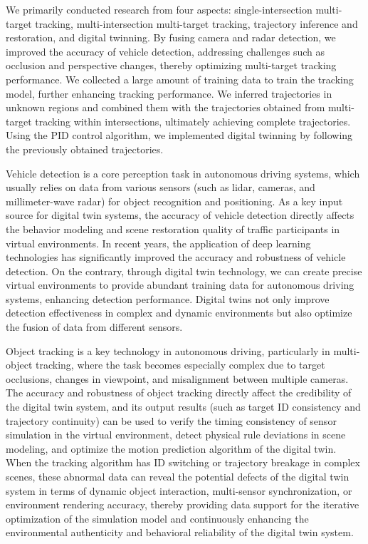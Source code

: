 \documentclass[lettersize,journal]{IEEEtran}
\begin{document}
We primarily conducted research from four aspects: single-intersection multi-target tracking, multi-intersection multi-target tracking, trajectory inference and restoration, and digital twinning. 
By fusing camera and radar detection, we improved the accuracy of vehicle detection, addressing challenges such as occlusion and perspective changes, thereby optimizing multi-target tracking performance. 
We collected a large amount of training data to train the tracking model, further enhancing tracking performance. 
We inferred trajectories in unknown regions and combined them with the trajectories obtained from multi-target tracking within intersections, ultimately achieving complete trajectories. 
Using the PID control algorithm, we implemented digital twinning by following the previously obtained trajectories.

Vehicle detection is a core perception task in autonomous driving systems, which usually relies on data from various sensors (such as lidar, cameras, and millimeter-wave radar) for object recognition and positioning. As a key input source for digital twin systems, the accuracy of vehicle detection directly affects the behavior modeling and scene restoration quality of traffic participants in virtual environments. 
In recent years, the application of deep learning technologies has significantly improved the accuracy and robustness of vehicle detection. 
On the contrary, through digital twin technology, we can create precise virtual environments to provide abundant training data for autonomous driving systems, enhancing detection performance. 
Digital twins not only improve detection effectiveness in complex and dynamic environments but also optimize the fusion of data from different sensors\cite{Alpher20}.

Object tracking is a key technology in autonomous driving, particularly in multi-object tracking, where the task becomes especially complex due to target occlusions, changes in viewpoint, and misalignment between multiple cameras. 
The accuracy and robustness of object tracking directly affect the credibility of the digital twin system, and its output results (such as target ID consistency and trajectory continuity) can be used to verify the timing consistency of sensor simulation in the virtual environment, detect physical rule deviations in scene modeling, and optimize the motion prediction algorithm of the digital twin.
When the tracking algorithm has ID switching or trajectory breakage in complex scenes, these abnormal data can reveal the potential defects of the digital twin system in terms of dynamic object interaction, multi-sensor synchronization, or environment rendering accuracy, thereby providing data support for the iterative optimization of the simulation model and continuously enhancing the environmental authenticity and behavioral reliability of the digital twin system\cite{Alpher22b}.
\end{document}
